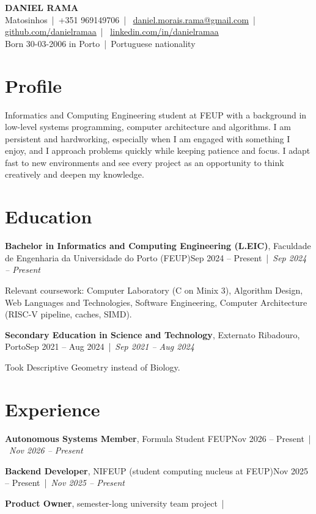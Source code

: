 \documentclass[11pt]{article}
\newcommand{\entry}[3]{%
  \textbf{#1}, #2\ifx\relax#3\relax\else\ {\color{dategray}|}\ {\color{dategray}\itshape #3}\fi\par}
\newcommand{\sep}{\ |\ }
\begin{document}
{\color{accent}\fontsize{24}{28}\selectfont\bfseries DANIEL RAMA}\\[2pt]
{\small\color{dategray}
Matosinhos\sep +351 969149706\sep
\href{mailto:daniel.morais.rama@gmail.com}{\underline{daniel.morais.rama@gmail.com}}\sep
\href{https://github.com/danielramaa}{\underline{github.com/danielramaa}}\sep
\href{https://linkedin.com/in/danielramaa}{\underline{linkedin.com/in/danielramaa}}\\
Born 30-03-2006 in Porto\sep Portuguese nationality}

\section{Profile}
Informatics and Computing Engineering student at FEUP with a background in low-level systems programming,
computer architecture and algorithms. I am persistent and hardworking, especially when I am engaged with
something I enjoy, and I approach problems quickly while keeping patience and focus. I adapt fast to new
environments and see every project as an opportunity to think creatively and deepen my knowledge.

\section{Education}
\entry{Bachelor in Informatics and Computing Engineering (L.EIC)}
      {Faculdade de Engenharia da Universidade do Porto (FEUP)}
      {Sep 2024 -- Present}
Relevant coursework: Computer Laboratory (C on Minix 3), Algorithm Design, Web Languages and Technologies,
Software Engineering, Computer Architecture (RISC-V pipeline, caches, SIMD).

\entry{Secondary Education in Science and Technology}
      {Externato Ribadouro, Porto}
      {Sep 2021 -- Aug 2024}
Took Descriptive Geometry instead of Biology.

\section{Experience}
\entry{Autonomous Systems Member}
      {Formula Student FEUP}
      {Nov 2026 -- Present}
\entry{Backend Developer}
      {NIFEUP (student computing nucleus at FEUP)}
      {Nov 2025 -- Present}
\entry{Product Owner}
      {semester-long university team project}
      {}   %
\end{document}
